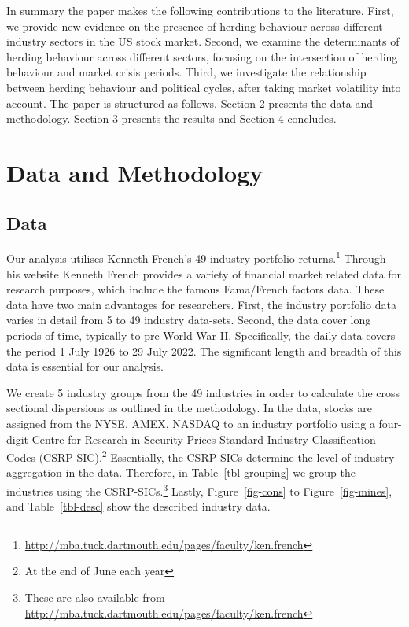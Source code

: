 \documentclass[
  letterpaper,
  DIV=11,
  numbers=noendperiod]{scrartcl}
\begin{document}
In summary the paper makes the following contributions to the
literature. First, we provide new evidence on the presence of herding
behaviour across different industry sectors in the US stock market.
Second, we examine the determinants of herding behaviour across
different sectors, focusing on the intersection of herding behaviour and
market crisis periods. Third, we investigate the relationship between
herding behaviour and political cycles, after taking market volatility
into account. The paper is structured as follows. Section 2 presents the
data and methodology. Section 3 presents the results and Section 4
concludes.

\section{Data and Methodology}\label{data-and-methodology}

\subsection{Data}\label{data}

Our analysis utilises Kenneth French's 49 industry portfolio
returns.\footnote{\url{http://mba.tuck.dartmouth.edu/pages/faculty/ken.french}}
Through his website Kenneth French provides a variety of financial
market related data for research purposes, which include the famous
Fama/French factors data. These data have two main advantages for
researchers. First, the industry portfolio data varies in detail from 5
to 49 industry data-sets. Second, the data cover long periods of time,
typically to pre World War II. Specifically, the daily data covers the
period 1 July 1926 to 29 July 2022. The significant length and breadth
of this data is essential for our analysis.

We create 5 industry groups from the 49 industries in order to calculate
the cross sectional dispersions as outlined in the methodology. In the
data, stocks are assigned from the NYSE, AMEX, NASDAQ to an industry
portfolio using a four-digit Centre for Research in Security Prices
Standard Industry Classification Codes (CSRP-SIC).\footnote{At the end
  of June each year} Essentially, the CSRP-SICs determine the level of
industry aggregation in the data. Therefore, in Table~\ref{tbl-grouping}
we group the industries using the CSRP-SICs.\footnote{These are also
  available from
  \url{http://mba.tuck.dartmouth.edu/pages/faculty/ken.french}} Lastly,
Figure~\ref{fig-cons} to Figure~\ref{fig-mines}, and
Table~\ref{tbl-desc} show the described industry data.
\end{document}
